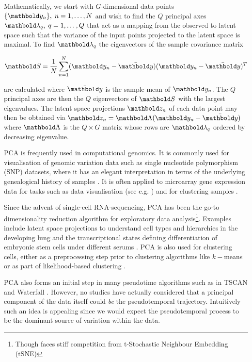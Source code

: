 Mathematically, we start with $G$-dimensional data points $\{\mby_n\}, \; n = 1, \ldots, N$ and wish to find the $Q$ principal axes $\mblambda_q, \; q = 1, \ldots, Q$ that act as a mapping from the observed to latent space such that the variance of the input points projected to the latent space is maximal. To find $\mblambda_q$ the eigenvectors of the sample covariance matrix

\begin{equation}
  \mbS = \frac{1}{N}\sum_{n = 1}^N (\mby_n - \bar{\mby}) (\mby_n - \bar{\mby})^T
\end{equation}

are calculated where $\bar{\mby}$ is the sample mean of $\mby_n$. The $Q$ principal axes are then the $Q$ eigenvectors of $\mbS$ with the largest eigenvalues. The latent space projections $\mbz_n$ of each data point may then be obtained via $\mbz_n = \mbLambda (\mby_n - \bar{\mby})$ where $\mbLambda$ is the $Q \times G$ matrix whose rows are $\mblambda_q$ ordered by decreasing eigenvalue.

PCA is frequently used in computational genomics. It is commonly used for visualisation of genomic variation data such as single nucleotide polymorphism (SNP) datasets, where it has an elegant interpretation in terms of the underlying genealogical history of samples \cite{mcvean2009genealogical}.
It is often applied to microarray gene expression data for tasks such as data visualisation (see e.g. \cite{ringner2008principal}) and for clustering samples \cite{yeung2001principal}.

Since the advent of single-cell RNA-sequencing, PCA has been the go-to dimensionality reduction algorithm for exploratory data analysis\footnote{Though faces stiff competition from t-Stochastic Neighbour Embedding (tSNE)}. Examples include latent space projections to understand cell types and hierarchies in the developing lung \cite{treutlein2014reconstructing} and the transcriptional states defining differentiation of embryonic stem cells under different serums \cite{kolodziejczyk2015single}. PCA is also used for clustering cells, either as a preprocessing step prior to clustering algorithms like $k-$means or as part of likelihood-based clustering \cite{yau2016pcareduce}.

PCA also forms an initial step in many pseudotime algorithms such as in TSCAN \cite{ji2016tscan} and Waterfall \cite{shin2015single}. However, no studies have actually considered that a principal component of the data itself could \emph{be} the pseudotemporal trajectory. Intuitively such an idea is appealing since we would expect the pseudotemporal process to be the dominant source of variation within the data.

